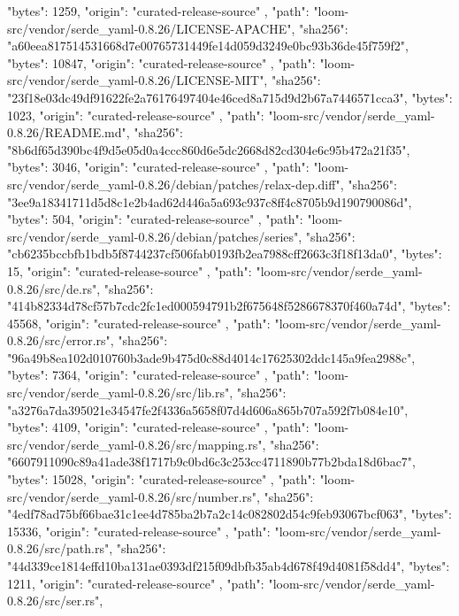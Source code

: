{{      "bytes": 1259,
      "origin": "curated-release-source"
    },
    {
      "path": "loom-src/vendor/serde_yaml-0.8.26/LICENSE-APACHE",
      "sha256": "a60eea817514531668d7e00765731449fe14d059d3249e0bc93b36de45f759f2",
      "bytes": 10847,
      "origin": "curated-release-source"
    },
    {
      "path": "loom-src/vendor/serde_yaml-0.8.26/LICENSE-MIT",
      "sha256": "23f18e03dc49df91622fe2a76176497404e46ced8a715d9d2b67a7446571cca3",
      "bytes": 1023,
      "origin": "curated-release-source"
    },
    {
      "path": "loom-src/vendor/serde_yaml-0.8.26/README.md",
      "sha256": "8b6df65d390bc4f9d5e05d0a4ccc860d6e5dc2668d82cd304e6c95b472a21f35",
      "bytes": 3046,
      "origin": "curated-release-source"
    },
    {
      "path": "loom-src/vendor/serde_yaml-0.8.26/debian/patches/relax-dep.diff",
      "sha256": "3ee9a18341711d5d8c1e2b4ad62d446a5a693c937c8ff4c8705b9d190790086d",
      "bytes": 504,
      "origin": "curated-release-source"
    },
    {
      "path": "loom-src/vendor/serde_yaml-0.8.26/debian/patches/series",
      "sha256": "cb6235bccbfb1bdb5f8744237cf506fab0193fb2ea7988cff2663c3f18f13da0",
      "bytes": 15,
      "origin": "curated-release-source"
    },
    {
      "path": "loom-src/vendor/serde_yaml-0.8.26/src/de.rs",
      "sha256": "414b82334d78cf57b7cdc2fc1ed000594791b2f675648f5286678370f460a74d",
      "bytes": 45568,
      "origin": "curated-release-source"
    },
    {
      "path": "loom-src/vendor/serde_yaml-0.8.26/src/error.rs",
      "sha256": "96a49b8ea102d010760b3ade9b475d0c88d4014c17625302ddc145a9fea2988c",
      "bytes": 7364,
      "origin": "curated-release-source"
    },
    {
      "path": "loom-src/vendor/serde_yaml-0.8.26/src/lib.rs",
      "sha256": "a3276a7da395021e34547fe2f4336a5658f07d4d606a865b707a592f7b084e10",
      "bytes": 4109,
      "origin": "curated-release-source"
    },
    {
      "path": "loom-src/vendor/serde_yaml-0.8.26/src/mapping.rs",
      "sha256": "6607911090c89a41ade38f1717b9c0bd6c3c253cc4711890b77b2bda18d6bac7",
      "bytes": 15028,
      "origin": "curated-release-source"
    },
    {
      "path": "loom-src/vendor/serde_yaml-0.8.26/src/number.rs",
      "sha256": "4edf78ad75bf66bae31c1ee4d785ba2b7a2c14c082802d54c9feb93067bcf063",
      "bytes": 15336,
      "origin": "curated-release-source"
    },
    {
      "path": "loom-src/vendor/serde_yaml-0.8.26/src/path.rs",
      "sha256": "44d339ce1814effd10ba131ae0393df215f09dbfb35ab4d678f49d4081f58dd4",
      "bytes": 1211,
      "origin": "curated-release-source"
    },
    {
      "path": "loom-src/vendor/serde_yaml-0.8.26/src/ser.rs",
}}
